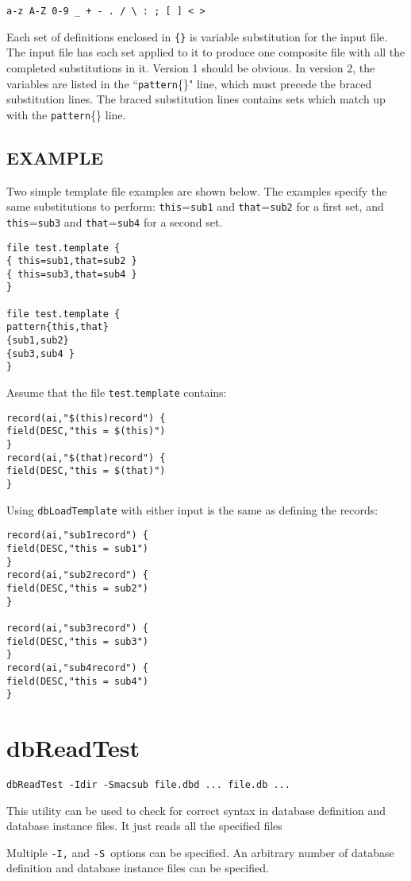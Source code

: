 \begin{verbatim}a-z A-Z 0-9 _ + - . / \ : ; [ ] < >
\end{verbatim}Each set of definitions enclosed in \verb|{}| is variable substitution for the input file. The input file has each set applied to it to 
produce one composite file with all the completed substitutions in it. Version 1 should be obvious. In version 2, the 
variables are listed in the ``\verb|pattern|\{\}" line, which must precede the braced substitution lines. The braced substitution 
lines contains sets which match up with the \verb|pattern|\{\} line.

\subsection{EXAMPLE}

Two simple template file examples are shown below. The examples specify the same substitutions to perform: 
\verb|this|=\verb|sub1| and \verb|that|=\verb|sub2| for a first set, and \verb|this|=\verb|sub3| and \verb|that|=\verb|sub4| for a second set. 

\begin{verbatim}file test.template {
{ this=sub1,that=sub2 }
{ this=sub3,that=sub4 }
}

file test.template {
pattern{this,that}
{sub1,sub2}
{sub3,sub4 }
}
\end{verbatim}Assume that the file \verb|test|.\verb|template| contains:

\begin{verbatim}record(ai,"$(this)record") {
field(DESC,"this = $(this)")
}
record(ai,"$(that)record") {
field(DESC,"this = $(that)")
}
\end{verbatim}

Using \verb|dbLoadTemplate| with either input is the same as defining the records:

\begin{verbatim}record(ai,"sub1record") {
field(DESC,"this = sub1")
}
record(ai,"sub2record") {
field(DESC,"this = sub2")
}

record(ai,"sub3record") {
field(DESC,"this = sub3")
}
record(ai,"sub4record") {
field(DESC,"this = sub4")
}
\end{verbatim}\section{dbReadTest}

\begin{verbatim}dbReadTest -Idir -Smacsub file.dbd ... file.db ...
\end{verbatim}This utility can be used to check for correct syntax in database definition and database instance files. It just reads all the 
specified files

Multiple \verb|-I,| and \verb|-S |options can be specified. An arbitrary number of database definition and database instance files can 
be specified.








